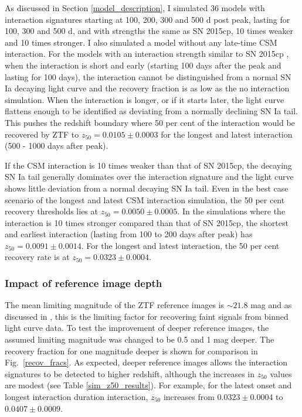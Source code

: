 \documentclass[a4paper,oneside,12pt, class=Latex/Classes/PhDthesisPSnPDF, crop=false]{standalone}
\begin{document}
 As discussed in Section \ref{model_description}, I simulated 36 models with interaction signatures starting at 100, 200, 300 and 500 d post peak, lasting for 100, 300 and 500 d, and with strengths the same as SN 2015cp, 10 times weaker and 10 times stronger. I also simulated a model without any late-time CSM interaction. For the models with an interaction strength similar to SN 2015cp \citep{2015cp}, when the interaction is short and early (starting 100 days after the peak and lasting for 100 days), the interaction cannot be distinguished from a normal SN Ia decaying light curve and the recovery fraction is as low as the no interaction simulation. When the interaction is longer, or if it starts later, the light curve flattens enough to be identified as deviating from a normally declining SN Ia tail. This pushes the redshift boundary where 50 per cent of the interaction would be recovered by ZTF to $z_{50} = 0.0105 \pm 0.0003$ for the longest and latest interaction (500 - 1000 days after peak).

If the CSM interaction is 10 times weaker than that of SN 2015cp, the decaying SN Ia tail generally dominates over the interaction signature and the light curve shows little deviation from a normal decaying SN Ia tail. Even in the best case scenario of the longest and latest CSM interaction simulation, the 50 per cent recovery thresholds lies at $z_{50} = 0.0050 \pm 0.0005$. In the simulations where the interaction is 10 times stronger compared than that of SN 2015cp, the shortest and earliest interaction (lasting from 100 to 200 days after peak) has $z_{50} = 0.0091 \pm 0.0014$. For the longest and latest interaction, the 50 per cent recovery rate is at $z_{50} = 0.0323 \pm 0.0004$.


\subsubsection{Impact of reference image depth}
\label{impact_refdepth}
The mean limiting magnitude of the ZTF reference images is $\sim 21.8$ mag and as discussed in \citep{ref_uncert}, this is the limiting factor for recovering faint signals from binned light curve data. To test the improvement of deeper reference images, the assumed limiting magnitude was changed to be 0.5 and 1 mag deeper. The recovery fraction for one magnitude deeper is shown for comparison in Fig.~\ref{recov_fracs}. As expected, deeper reference images allows the interaction signatures to be detected to higher redshift, although the increases in $z_{50}$ values are modest (see Table \ref{sim_z50_results}). For example, for the latest onset and longest interaction duration interaction, $z_{50}$ increases from $0.0323 \pm 0.0004$ to $0.0407 \pm 0.0009$.
\end{document}
